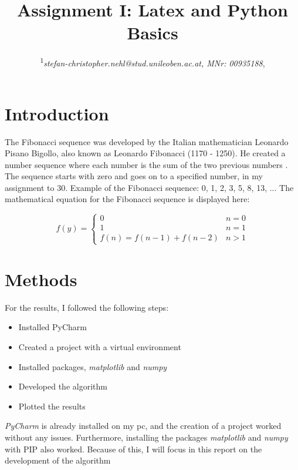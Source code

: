 \documentclass[10pt, a4paper, twocolumn]{article} %
\title{Assignment I: Latex and Python Basics} %
\author{
	\coursetitle{Exercises in Machine Learning (190.013), SS2022}
	\authorstyle{Stefan Nehl\textsuperscript{1}} %
	\newline\newline %
	\textsuperscript{1}\textit{stefan-christopher.nehl@stud.unileoben.ac.at, MNr: 00935188}, \institution{Montanuniversität Leoben, Austria}\\ %
	\newline\submissiondate{\today} %
}
\begin{document}

\maketitle %

\thispagestyle{firstpage} %




\section{Introduction}
The Fibonacci sequence was developed by the Italian mathematician Leonardo Pisano Bigollo, also known as Leonardo Fibonacci (1170 - 1250). He created a number sequence where each number is the sum of the two previous numbers \citep{canaan2011all}. The sequence starts with zero and goes on to a specified number, in my assignment to 30. Example of the Fibonacci sequence: 0, 1, 2, 3, 5, 8, 13, ...
The mathematical equation for the Fibonacci sequence is displayed here: 

\[
 f(y) =
\begin{cases}
	0 & {n = 0}\\
  	1 & {n = 1}\\
  	f(n) = f(n-1) + f(n-2) & n > 1
\end{cases}
\]
\citep{canaan2011all}

\section{Methods}
For the results, I followed the following steps: 

\begin{itemize}
	\item Installed PyCharm
	\item Created a project with a virtual environment 
	\item Installed packages, \textit{matplotlib} and \textit{numpy}
	\item Developed the algorithm
	\item Plotted the results
\end{itemize}
\textit{PyCharm} is already installed on my pc, and the creation of a project worked without any issues.   Furthermore, installing the packages \textit{matplotlib} and \textit{numpy} with PIP also worked. Because of this, I will focus in this report on the development of the algorithm
\end{document}
